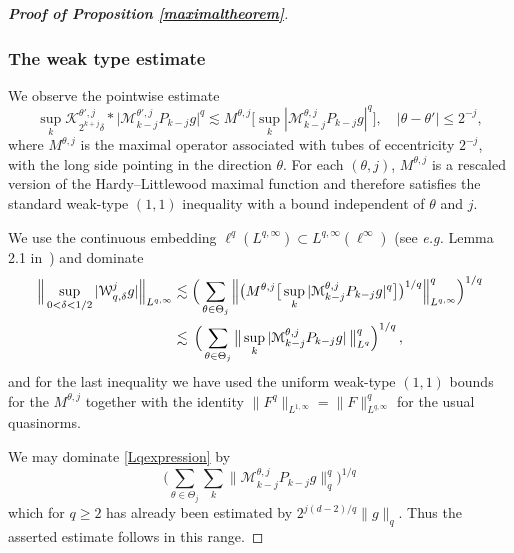 \documentclass[11pt]{amsart}
\theoremstyle{definition}
\numberwithin{theorem}{section}
\numberwithin{definition}{section}
\newcommand{\note}[1]{\footnote{\texttt{\Small #1}}}
\def\eg{{\it e.g. }}
\def\lc{\lesssim}
\def\cK{{\mathcal {K}}}
\def\cM{{\mathcal {M}}}
\def\cW{{\mathcal {W}}}
\begin{document}
\begin{proof}[\bf Proof of Proposition \ref {maximaltheorem}]
\subsubsection*{The weak type estimate}
We observe the pointwise estimate
$$
\sup_k \cK^{\theta',j}_{2^{k+j}\delta}
*\big|\cM^{\theta',j}_{k-j}
P_{k-j} g\big|^q
\lc M^{\theta,j} \big[ \sup_k |\cM^{\theta,j}_{k-j}
P_{k-j} g|^q \big], \quad |\theta-\theta'|\le 2^{-j},
$$
where $M^{\theta,j}$ is the maximal operator associated with 
 tubes of eccentricity $2^{-j}$, with the long side pointing in the direction $\theta$.
For each $(\theta,j)$, $M^{\theta,j}$ is a rescaled version of the Hardy--Littlewood maximal function and therefore satisfies the standard weak-type
$(1,1)$ inequality with a bound independent of  $\theta$ and $j$.


We use the continuous embedding $\ell^q(L^{q,\infty})\subset L^{q,\infty}(\ell^\infty)$ (see \eg  Lemma 2.1 in~\cite{gs}) and dominate
\begin{align}\Big\| \sup_{0<\delta<1/2} |\cW_{q,\delta}^j g|\Big\|_{L^{q,\infty}}
&\lc \Big(\sum_{\theta\in \Theta_j} \Big\| \big(
M^{\theta,j} \big[ \sup_k |\cM^{\theta,j}_{k-j}
P_{k-j} g|^q \big]\big)^{1/q}\Big\|_{L^{q,\infty}}^q\Big)^{1/q}
\notag
\\
&\lc\,\Big(\sum_{\theta\in \Theta_j} \big\|
\sup_k |\cM^{\theta,j}_{k-j}
P_{k-j} g|\, \big\|_{L^q}^q\Big)^{1/q}\, ,
\label{Lqexpression}
\end{align}
and for the last inequality  we have used
 the uniform weak-type $(1,1)$ bounds for the
 $M^{\theta,j}$ together with the identity
$\|F^q\|_{L^{1,\infty}} = \|F\|_{L^{q,\infty}}^q$ for the usual quasinorms.

We may dominate  \eqref{Lqexpression} by
$$
\Big(\sum_{\theta\in \Theta_j}\sum_k \big\|
\cM^{\theta,j}_{k-j}
P_{k-j} g\big\|_{q}^q\Big)^{1/q}
$$
which for $q\ge 2$ has already been estimated by $2^{j(d-2)/q}\|g\|_q$.
Thus the asserted estimate follows in this range.


\end{proof}
\end{document}

